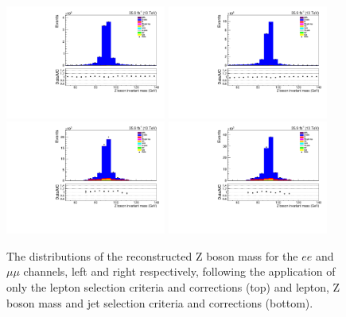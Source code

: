 \begin{figure}[tbp]
\centering
\includegraphics[width=0.47\textwidth]{figs/background-estimation/plots/unblinded/prompt_ee_ttbarInc/zPairMass_NPL_ee_lepSel_ee.pdf}
\includegraphics[width=0.47\textwidth]{figs/background-estimation/plots/unblinded/prompt_mumu_ttbarInc/zPairMass_NPL_mumu_lepSel_mumu.pdf}
\\
\includegraphics[width=0.47\textwidth]{figs/background-estimation/plots/unblinded/prompt_ee_ttbarInc/zPairMass_NPL_ee_jetSel_ee.pdf}
\includegraphics[width=0.47\textwidth]{figs/background-estimation/plots/unblinded/prompt_mumu_ttbarInc/zPairMass_NPL_mumu_jetSel_mumu.pdf}
\caption{
The distributions of the reconstructed Z boson mass for the $ee$ and $\mu\mu$ channels, left and right respectively, following the application of only the lepton selection criteria and corrections (top) and lepton, Z boson mass and jet selection criteria and corrections (bottom).
}
\label{fig:SR_zBoson}
\end{figure}

